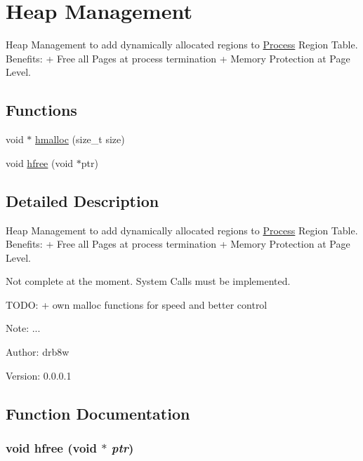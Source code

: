 \hypertarget{group___v_m_m___h_e_a_p}{
\section{Heap Management}
\label{group___v_m_m___h_e_a_p}
}
Heap Management to add dynamically allocated regions to \hyperlink{struct_process}{Process} Region Table. Benefits: + Free all Pages at process termination + Memory Protection at Page Level.  


\subsection*{Functions}
\begin{CompactItemize}
\item 
void $\ast$ \hyperlink{group___v_m_m___h_e_a_p_g3303e6b60e6122fb992cfc51ec01616f}{hmalloc} (size\_\-t size)
\item 
void \hyperlink{group___v_m_m___h_e_a_p_gb66bfae7d7a736214c5f9c9a566f2b22}{hfree} (void $\ast$ptr)
\end{CompactItemize}


\subsection{Detailed Description}
Heap Management to add dynamically allocated regions to \hyperlink{struct_process}{Process} Region Table. Benefits: + Free all Pages at process termination + Memory Protection at Page Level. 

Not complete at the moment. System Calls must be implemented.

TODO: + own malloc functions for speed and better control \begin{Desc}
\item[Note:]... \end{Desc}
\begin{Desc}
\item[Author:]drb8w \end{Desc}
\begin{Desc}
\item[Version:]0.0.0.1 \end{Desc}


\subsection{Function Documentation}
\hypertarget{group___v_m_m___h_e_a_p_gb66bfae7d7a736214c5f9c9a566f2b22}{
\subsubsection[{hfree}]{\setlength{\rightskip}{0pt plus 5cm}void hfree (void $\ast$ {\em ptr})}}
\label{group___v_m_m___h_e_a_p_gb66bfae7d7a736214c5f9c9a566f2b22}


